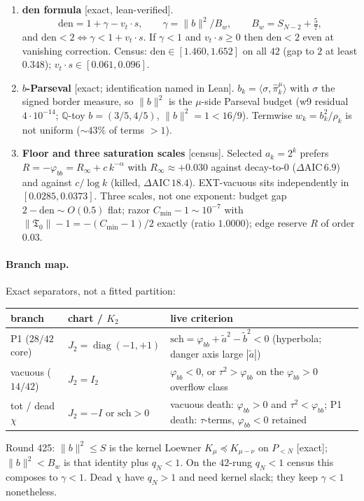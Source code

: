 \documentclass[11pt]{article}
\theoremstyle{remark}
\newcommand{\gr}[1]{\textnormal{\small[#1]}}
\begin{document}
\begin{enumerate}
\item \textbf{den formula}
\gr{exact, lean-verified}.
\[
\mathrm{den}
=1+\gamma-v_t\cdot s,
\qquad
\gamma=\|b\|^2/B_w,
\qquad
B_w=S_{N-2}+\tfrac57,
\]
and $\mathrm{den}<2\iff\gamma<1+v_t\cdot s$.  If $\gamma<1$ and
$v_t\cdot s\ge 0$ then $\mathrm{den}<2$ even at vanishing
correction.  Census: $\mathrm{den}\in[1.460,1.652]$ on all $42$
(gap to $2$ at least $0.348$); $v_t\cdot s\in[0.061,0.096]$.

\item \textbf{$b$-Parseval}
\gr{exact; identification named in Lean}.
$b_k=\langle\sigma,\hat\pi_k^\mu\rangle$ with $\sigma$ the signed
border measure, so $\|b\|^2$ is the $\mu$-side Parseval budget
(w9 residual $4\cdot10^{-14}$; $\mathbb{Q}$-toy
$b=(3/5,4/5)$, $\|b\|^2=1<16/9$).  Termwise
$w_k=b_k^2/\rho_k$ is not uniform ($\sim 43\%$ of terms $>1$).

\item \textbf{Floor and three saturation scales}
\gr{census}.
Selected $a_k=2^k$ prefers $R=-\varphi_{bb}=R_\infty+c\,k^{-\alpha}$
with $R_\infty\approx +0.030$ against decay-to-$0$
($\Delta\mathrm{AIC}\,6.9$) and against $c/\log k$ (killed,
$\Delta\mathrm{AIC}\,18.4$).  EXT-vacuous sits independently in
$[0.0285,0.0373]$.  Three scales, not one exponent: budget gap
$2-\mathrm{den}\sim O(0.5)$ flat; razor
$C_{\min}-1\sim 10^{-7}$ with
$\|\mathfrak{T}_0\|-1=-(C_{\min}-1)/2$ exactly (ratio $1.0000$);
edge reserve $R$ of order $0.03$.
\end{enumerate}

\paragraph{Branch map.}
Exact separators, not a fitted partition:
\begin{center}
\small
\begin{tabular}{@{}p{3.2cm}p{3.6cm}p{6.2cm}@{}}
\toprule
branch & chart / $K_2$ & live criterion \\
\midrule
P1 ($28/42$ core) &
  $J_2=\operatorname{diag}(-1,+1)$ &
  $\mathrm{sch}=\varphi_{bb}+\tilde a^2-\tilde b^2<0$
  (hyperbola; danger axis large $|\tilde a|$) \\
vacuous ($14/42$) &
  $J_2=I_2$ &
  $\varphi_{bb}<0$, or $\tau^2>\varphi_{bb}$ on the
  $\varphi_{bb}>0$ overflow class \\
tot / dead $\chi$ &
  $J_2=-I$ or $\mathrm{sch}>0$ &
  vacuous death: $\varphi_{bb}>0$ and $\tau^2<\varphi_{bb}$;
  P1 death: $\tau$-terms, $\varphi_{bb}<0$ retained \\
\bottomrule
\end{tabular}
\end{center}
Round 425: $\|b\|^2\le S$ is the kernel Loewner
$K_\mu\preccurlyeq K_{\mu-\nu}$ on $P_{<N}$ \gr{exact};
$\|b\|^2<B_w$ is that identity plus $q_N<1$.  On the $42$-rung
$q_N<1$ census this composes to $\gamma<1$.  Dead $\chi$ have
$q_N>1$ and need kernel slack; they keep $\gamma<1$ nonetheless.
\end{document}
